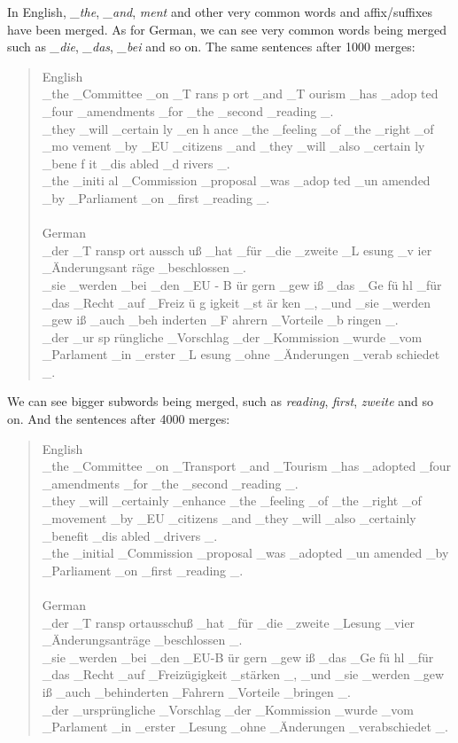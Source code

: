 In English, \emph{\_the}, \emph{\_and}, \emph{ment} and other very common words and affix/suffixes have been merged. As for German, we can see very common words being merged such as \emph{\_die}, \emph{\_das}, \emph{\_bei} and so on. The same sentences after 1000 merges:

\begin{quote}
	English\\
	\_the \_Committee \_on \_T rans p ort \_and \_T ourism \_has \_adop ted \_four \_amendments \_for \_the \_second \_reading \_.\\
	\_they \_will \_certain ly \_en h ance \_the \_feeling \_of \_the \_right \_of \_mo vement \_by \_EU \_citizens \_and \_they \_will \_also \_certain ly \_bene f it \_dis abled \_d rivers \_.\\
	\_the \_initi al \_Commission \_proposal \_was \_adop ted \_un amended \_by \_Parliament \_on \_first \_reading \_.\\\\
	German\\
	\_der \_T ransp ort aussch uß \_hat \_für \_die \_zweite \_L esung \_v ier \_Änderungsant räge \_beschlossen \_.\\
	\_sie \_werden \_bei \_den \_EU - B ür gern \_gew iß \_das \_Ge fü hl \_für \_das \_Recht \_auf \_Freiz ü g igkeit \_st är ken \_, \_und \_sie \_werden \_gew iß \_auch \_beh inderten \_F ahrern \_Vorteile \_b ringen \_.\\
	\_der \_ur sp rüngliche \_Vorschlag \_der \_Kommission \_wurde \_vom \_Parlament \_in \_erster \_L esung \_ohne \_Änderungen \_verab schiedet \_.
\end{quote}

\clearpage
We can see bigger subwords being merged, such as \emph{reading}, \emph{first}, \emph{zweite} and so on. And the sentences after 4000 merges:

\begin{quote}
	English\\
	\_the \_Committee \_on \_Transport \_and \_Tourism \_has \_adopted \_four \_amendments \_for \_the \_second \_reading \_.\\
	\_they \_will \_certainly \_enhance \_the \_feeling \_of \_the \_right \_of \_movement \_by \_EU \_citizens \_and \_they \_will \_also \_certainly \_benefit \_dis abled \_drivers \_.\\
	\_the \_initial \_Commission \_proposal \_was \_adopted \_un amended \_by \_Parliament \_on \_first \_reading \_.\\\\
	German\\
	\_der \_T ransp ortausschuß \_hat \_für \_die \_zweite \_Lesung \_vier \_Änderungsanträge \_beschlossen \_.\\
	\_sie \_werden \_bei \_den \_EU-B ür gern \_gew iß \_das \_Ge fü hl \_für \_das \_Recht \_auf \_Freizügigkeit \_stärken \_, \_und \_sie \_werden \_gew iß \_auch \_behinderten \_Fahrern \_Vorteile \_bringen \_.\\
	\_der \_ursprüngliche \_Vorschlag \_der \_Kommission \_wurde \_vom \_Parlament \_in \_erster \_Lesung \_ohne \_Änderungen \_verabschiedet \_.
\end{quote}

